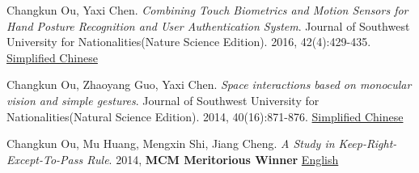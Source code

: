    \item{
       Changkun Ou, Yaxi Chen. 
       \emph{Combining Touch Biometrics and Motion Sensors for Hand Posture Recognition and User Authentication System}. 
       Journal of Southwest University for Nationalities(Nature Science Edition). 
       2016, 42(4):429-435. \href{https://changkun.us/files/cv/touch.swun.html}{Simplified Chinese}
   }
   \item{
       Changkun Ou, Zhaoyang Guo, Yaxi Chen.
       \emph{Space interactions based on monocular vision and simple gestures}. 
       Journal of Southwest University for Nationalities(Natural Science Edition). 
       2014, 40(16):871-876. \href{https://changkun.us/files/cv/vision.swun.html}{Simplified Chinese}
   }
   \item{
       Changkun Ou, Mu Huang, Mengxin Shi, Jiang Cheng. 
       \emph{A Study in Keep-Right-Except-To-Pass Rule}. 
       2014, \textbf{MCM Meritorious Winner} \href{https://changkun.us/files/cv/28922.public.html}{English}
   }
 \resumeSubHeadingListEnd